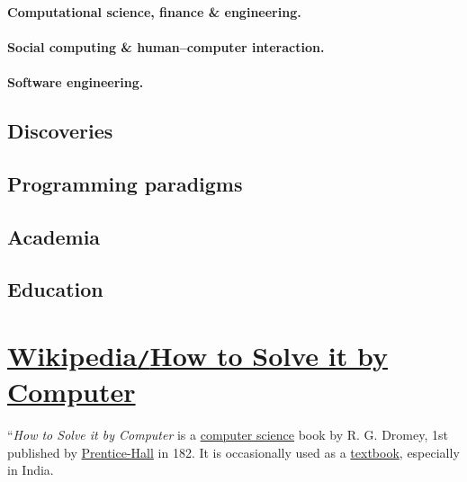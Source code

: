 \documentclass[oneside]{book}
\numberwithin{equation}{section}
\begin{document}
\paragraph{Computational science, finance \& engineering.}

\paragraph{Social computing \& human--computer interaction.}

\paragraph{Software engineering.}

\subsection{Discoveries}

\subsection{Programming paradigms}

\subsection{Academia}

\subsection{Education}


\section{\href{https://en.wikipedia.org/wiki/How_to_Solve_it_by_Computer}{Wikipedia\texttt{/}How to Solve it by Computer}}
``\textit{How to Solve it by Computer} is a \href{https://en.wikipedia.org/wiki/Computer_science}{computer science} book by R. G. Dromey, 1st published by \href{https://en.wikipedia.org/wiki/Prentice-Hall}{Prentice-Hall} in 182. It is occasionally used as a \href{https://en.wikipedia.org/wiki/Textbook}{textbook}, especially in India.
\end{document}
